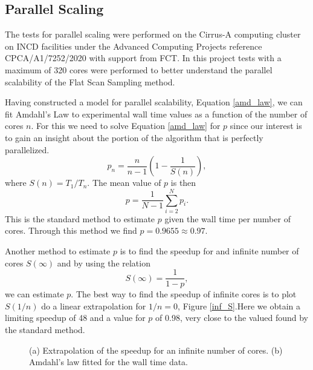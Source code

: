 \subsection{Parallel Scaling}
	
	The tests for parallel scaling were performed on the Cirrus-A computing cluster on INCD facilities under the Advanced Computing Projects reference CPCA/A1/7252/2020 with support from FCT. In this project tests with a maximum of 320 cores were performed to better understand the parallel scalability of the Flat Scan Sampling method.

	Having constructed a model for parallel scalability, Equation \ref{amd_law}, we can fit Amdahl's Law to experimental wall time values as a function of the number of cores $n$. For this we need to solve Equation \ref{amd_law} for $p$ since our interest is to gain an insight about the portion of the algorithm that is perfectly parallelized.
\begin{equation}
	p_n = \frac{n}{n-1} \left( 1 - \frac{1}{S(n)} \right),
\end{equation}
where $S(n) = T_1 / T_n$. The mean value of $p$ is then
\begin{equation}
	p = \frac{1}{N-1} \sum_{i=2}^{N} p_i.
\end{equation}
This is the standard method to estimate $p$ given the wall time per number of cores. Through this method we find  $p=0.9655\approx 0.97$.

	Another method to estimate $p$ is to find the speedup for and infinite number of cores $S(\infty)$ and by using the relation
\begin{equation}
	S(\infty) = \frac{1}{1-p},
\end{equation}
we can estimate $p$. The best way to find the speedup of infinite cores is to plot $S(1/n)$ do a linear extrapolation for $1/n=0$, Figure \ref{inf_S}.Here we obtain a limiting speedup of 48 and a value for $p$ of 0.98, very close to the valued found by the standard method.


\begin{figure}[h]
	\centering
	\caption{(a) Extrapolation of the speedup for an infinite number of cores. (b) Amdahl's law fitted for the wall time data.}
\end{figure}

